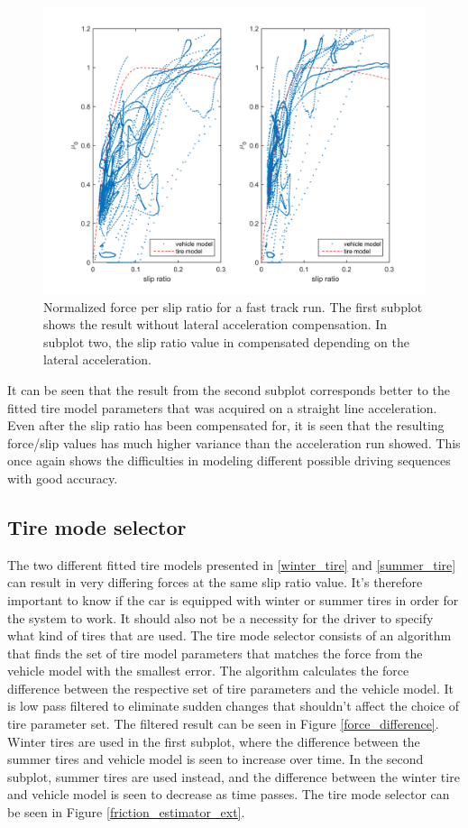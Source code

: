 \begin{figure}[h]
	\centering
	\includegraphics[width=1.0\textwidth]{Pictures/latacc_compensated}
	\caption {Normalized force per slip ratio for a fast track run. The first subplot shows the result without lateral acceleration compensation. In subplot two, the slip ratio value in compensated depending on the lateral acceleration.}
	\label{latacc_compensated}
\end{figure}

It can be seen that the result from the second subplot corresponds better to the fitted tire model parameters that was acquired on a straight line acceleration. Even after the slip ratio has been compensated for, it is seen that the resulting force/slip values has much higher variance than the acceleration run showed. This once again shows the difficulties in modeling different possible driving sequences with good accuracy. 

\subsection{Tire mode selector}
The two different fitted tire models presented in \ref{winter_tire} and \ref{summer_tire} can result in very differing forces at the same slip ratio value. It's therefore important to know if the car is equipped with winter or summer tires in order for the system to work. It should also not be a necessity for the driver to specify what kind of tires that are used. The tire mode selector consists  of an algorithm that finds the set of tire model parameters that matches the force from the vehicle model with the smallest error. The algorithm calculates the force difference between the respective set of tire parameters and the vehicle model. It is low pass filtered to eliminate sudden changes that shouldn't affect the choice of tire parameter set. The filtered result can be seen in Figure \ref{force_difference}. Winter tires are used in the first subplot, where the difference between the summer tires and vehicle model is seen to increase over time. In the second subplot, summer tires are used instead, and the difference between the winter tire and vehicle model is seen to decrease as time passes. The tire mode selector can be seen in Figure \ref{friction_estimator_ext}.

